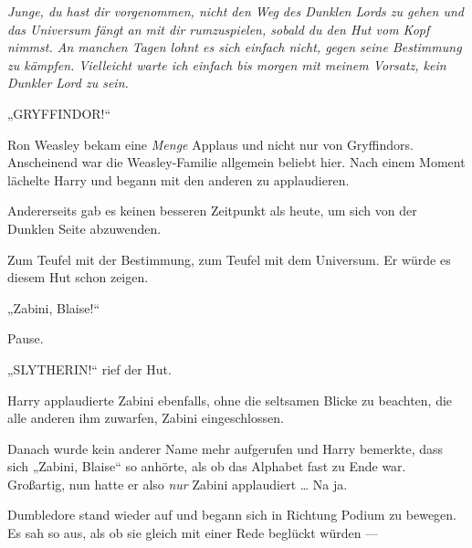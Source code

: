 \emph{Junge, du hast dir vorgenommen, nicht den Weg des Dunklen Lords zu gehen und das Universum fängt an mit dir rumzuspielen, sobald du den Hut vom Kopf nimmst. An manchen Tagen lohnt es sich einfach nicht, gegen seine Bestimmung zu kämpfen. Vielleicht warte ich einfach bis morgen mit meinem Vorsatz, kein Dunkler Lord zu sein.}

„GRYFFINDOR!“

Ron Weasley bekam eine \emph{Menge} Applaus und nicht nur von Gryffindors. Anscheinend war die Weasley-Familie allgemein beliebt hier. Nach einem Moment lächelte Harry und begann mit den anderen zu applaudieren.

Andererseits gab es keinen besseren Zeitpunkt als heute, um sich von der Dunklen Seite abzuwenden.

Zum Teufel mit der Bestimmung, zum Teufel mit dem Universum. Er würde es diesem Hut schon zeigen.

„Zabini, Blaise!“

Pause.

„SLYTHERIN!“ rief der Hut.

Harry applaudierte Zabini ebenfalls, ohne die seltsamen Blicke zu beachten, die alle anderen ihm zuwarfen, Zabini eingeschlossen.

Danach wurde kein anderer Name mehr aufgerufen und Harry bemerkte, dass sich
„Zabini, Blaise“ so anhörte, als ob das Alphabet fast zu Ende war. Großartig, nun hatte er also \emph{nur} Zabini applaudiert … Na ja.

Dumbledore stand wieder auf und begann sich in Richtung Podium zu bewegen. Es sah so aus, als ob sie gleich mit einer Rede beglückt würden —

